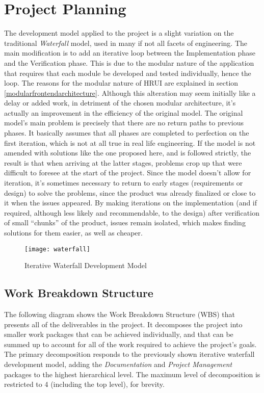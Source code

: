 \chapter{Project Planning} \label{planning}
The development model applied to the project is a slight variation on the traditional \textit{Waterfall} model, used in many 
if not all facets of engineering. The main modification is to add an iterative loop between the Implementation phase and the 
Verification phase. This is due to the modular nature of the application that requires that each module be developed and 
tested individually, hence the loop. The reasons for the modular nature of HRUI are explained in section 
\ref{modularfrontendarchitecture}. Although this alteration may seem initially like a delay or added work, in detriment of 
the chosen modular architecture, it's actually an improvement in the efficiency of the original model. The original model's 
main problem is precisely that there are no return paths to previous phases. It basically assumes that all phases are 
completed to perfection on the first iteration, which is not at all true in real life engineering. If the model is not 
amended with solutions like the one proposed here, and is followed strictly, the result is that when arriving at the latter 
stages, problems crop up that were difficult to foresee at the start of the project. Since the model doesn't allow for 
iteration, it's sometimes necessary to return to early stages (requirements or design) to solve the problems, since the 
product was already finalized or close to it when the issues appeared. By making iterations on the implementation (and if 
required, although less likely and recommendable, to the design) after verification of small ``chunks'' of the product, 
issues remain isolated, which makes finding solutions for them easier, as well as cheaper.
\begin{figure}[H]
\centering
\captionsetup{justification=centering}
\texttt{[image: waterfall]}
\caption{Iterative Waterfall Development Model}
\end{figure}
\section{Work Breakdown Structure}
The following diagram shows the Work Breakdown Structure (WBS) that presents all of the deliverables in the project. It 
decomposes the project into smaller work packages that can be achieved individually, and that can be summed up to account 
for all of the work required to achieve the project's goals. The primary decomposition responds to the previously shown 
iterative waterfall development model, adding the \textit{Documentation} and \textit{Project Management} packages to the 
highest hierarchical level. The maximum level of decomposition is restricted to 4 (including the top level), for brevity.\\

